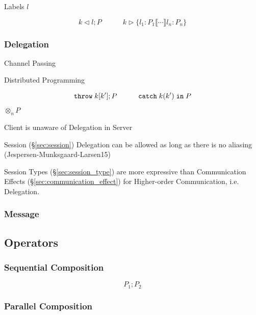 Labels $l$

\[
  k \lhd l; P
  \quad\quad\quad
  k \rhd \{ l_1 : P_1 \llbracket \cdots \rrbracket l_n : P_n \}
\]



\subsubsection{Delegation}\label{sec:delegation}

Channel Passing

Distributed Programming

\[
  \mathtt{throw} \; k[k']; P
  \quad\quad\quad
  \mathtt{catch} \; k(k') \; \mathtt{in} \; P
\]

$\otimes_n P$

Client is unaware of Delegation in Server

Session (\S\ref{sec:session}) Delegation can be allowed as long as
there is no aliasing (Jespersen-Munksgaard-Larsen15)

Session Types (\S\ref{sec:session_type}) are more expressive than
Communication Effects (\S\ref{sec:communication_effect}) for
Higher-order Communication, i.e. Delegation. \cite{orchard-yoshida16}




\subsubsection{Message}\label{sec:message}



\subsection{Operators}\label{sec:process_operators}

\subsubsection{Sequential Composition}\label{sec:sequential_composition}

\[
  P_1; P_2
\]



\subsubsection{Parallel Composition}\label{sec:parallel_composition}

